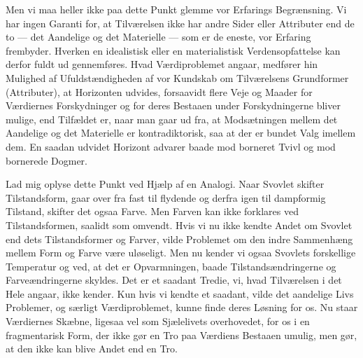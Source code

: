 \documentclass[12pt,a4paper,openany]{book}
\newcommand{\opage}[1]{\marginnote{\footnotesize\textit{[#1]}}}
\begin{document}
Men vi maa heller ikke paa dette Punkt glemme vor Erfarings Begrænsning.
Vi har ingen Garanti for, at Tilværelsen ikke har andre Sider eller
Attributer end de to --- det Aandelige og det Materielle --- som er de
eneste, vor Erfaring frembyder. Hverken en idealistisk eller en
materialistisk Verdensopfattelse kan derfor fuldt ud gennemføres. Hvad
Værdiproblemet angaar,
\opage{178}medfører hin Mulighed af Ufuldstændigheden af vor Kundskab om
Tilværelsens Grundformer (Attributer), at Horizonten udvides, forsaavidt
flere Veje og Maader for Værdiernes Forskydninger og for deres Bestaaen
under Forskydningerne bliver mulige, end Tilfældet er, naar man gaar ud
fra, at Modsætningen mellem det Aandelige og det Materielle er
kontradiktorisk, saa at der er bundet Valg imellem dem. En saadan
udvidet Horizont advarer baade mod borneret Tvivl og mod bornerede
Dogmer.

Lad mig oplyse dette Punkt ved Hjælp af en Analogi. Naar Svovlet skifter
Tilstandsform, gaar over fra fast til flydende og derfra igen til
dampformig Tilstand, skifter det ogsaa Farve. Men Farven kan ikke
forklares ved Tilstandsformen, saalidt som omvendt. Hvis vi nu ikke
kendte Andet om Svovlet end dets Tilstandsformer og Farver, vilde
Problemet om den indre Sammenhæng mellem Form og Farve være uløseligt.
Men nu kender vi ogsaa Svovlets forskellige Temperatur og ved, at det er
Opvarmningen, baade Tilstandsændringerne og Farveændringerne skyldes.
Det er et saadant Tredie, vi, hvad Tilværelsen i det Hele angaar, ikke
kender. Kun hvis vi kendte et saadant, vilde det aandelige Livs
Problemer, og særligt Værdiproblemet, kunne finde deres Løsning for os.
Nu staar Værdiernes Skæbne, ligesaa vel som Sjælelivets overhovedet, for
os i en fragmentarisk Form, der ikke gør en Tro paa Værdiens Bestaaen
umulig, men gør, at den ikke kan blive Andet end en Tro.
\end{document}
